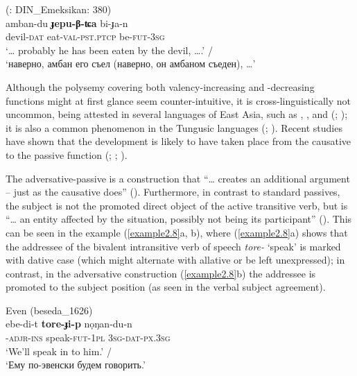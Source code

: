 \documentclass[output=paper,colorlinks,citecolor=brown]{langscibook}
\begin{document}
\ex
     (\citealt{Pakendorf2017}: DIN\_Emeksikan: 380)\\
    \gll amban-du	\textbf{ɟepu-β-ʨa}	bi-ɟa-n\\
    devil-\textsc{dat}	eat-\textsc{val-pst.ptcp}	be-\textsc{fut-3sg}\\
    \glt ‘… probably he has been eaten by the devil, ….’ /\\‘наверно, амбан его съел (наверно, он амбаном съеден), …’\\
    \z
\z

\begin{sloppypar}
Although the polysemy covering both valency-increasing and -decreasing functions might at first glance seem counter-intuitive, it is cross-linguistically not uncommon, being attested in several languages of East Asia, such as , , and  (\citealt[83--84]{Kazama2004}; \citealt[226]{Zúñiga2019}); it is also a common phenomenon in the Tungusic languages (\citealt[122]{Benzing1955AP}; \citealt[123--130]{Sunik1962}). Recent studies have shown that the development is likely to have taken place from the causative to the passive function (\citealt{LiWhaley2012}; \citealt{JangPayne2014}; \citealt{Nedjalkov2014}).
\end{sloppypar}

The adversative-passive is a construction that “… creates an additional argument – just as the causative does” (\citealt[131]{Palmer1994}). Furthermore, in contrast to standard passives, the subject is not the promoted direct object of the active transitive verb, but is “… an entity affected by the situation, possibly not being its participant” (\citealt[906]{Kazenin2001}). This can be seen in the  example (\ref{example2.8}a, b), where (\ref{example2.8}a) shows that the addressee of the bivalent intransitive verb of speech \textit{tore-} ‘speak’ is marked with dative case (which might alternate with allative or be left unexpressed); in contrast, in the adversative construction (\ref{example2.8}b) the addressee is promoted to the subject position (as seen in the verbal subject agreement).

\ea
    \label{example2.8}
    \ea
     Even (beseda\_1626)\\
    \gll ebe-di-t	\textbf{tore-ɟi-p}	nọŋan-du-n\\
    -\textsc{adjr-ins}	speak-\textsc{fut-1pl}	3\textsc{sg-dat-px.3sg}\\
    \glt ‘We'll speak in  to him.’ /\\‘Ему по-эвенски будем говорить.’\\
\end{document}
